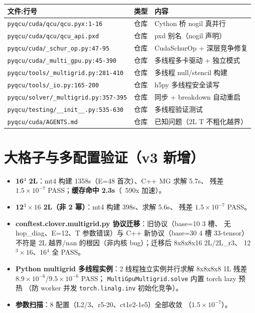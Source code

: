 \documentclass[UTF8]{ctexart}
\begin{document}
\begin{center}
\begin{tabular}{lll}
\toprule
文件:行号 & 类型 & 内容 \\
\midrule
\texttt{pyqcu/cuda/qcu/qcu.pyx:1-16} & 仓库 & Cython 桥 nogil 真并行 \\
\texttt{pyqcu/cuda/qcu/qcu\_api.pxd} & 仓库 & pxd 别名（nogil 声明）\\
\texttt{pyqcu/cuda/\_schur\_op.py:47-95} & 仓库 & CudaSchurOp + 深层竞争修复 \\
\texttt{pyqcu/cuda/\_multi\_gpu.py:45-390} & 仓库 & 多线程多卡驱动 + 独立模式 \\
\texttt{pyqcu/tools/\_multigrid.py:281-410} & 仓库 & 多线程 null/stencil 构建 \\
\texttt{pyqcu/tools/\_io.py:165-200} & 仓库 & h5py 多线程安全读写 \\
\texttt{pyqcu/solver/\_multigrid.py:357-395} & 仓库 & 同步 + breakdown 自动重启 \\
\texttt{pyqcu/testing/\_\_init\_\_.py:535-630} & 仓库 & 多线程验证测试 \\
\texttt{pyqcu/cuda/AGENTS.md} & 仓库 & 已知问题（2L T 不粗化越界）\\
\bottomrule
\end{tabular}
\end{center}

\section{大格子与多配置验证（v3 新增）}

\begin{itemize}
  \item \textbf{16$^4$ 2L}：mt4 构建 1358s（E=48 首次）、C++ MG 求解 5.7s、
        残差 $1.5\times10^{-7}$ PASS；\textbf{缓存命中 2.3s}（~590x 加速）。
  \item \textbf{12$^3\times16$ 2L（非 2 幂）}：mt4 构建 398s、求解 5.6s、
        残差 $1.5\times10^{-7}$ PASS。
  \item \textbf{conftest.clover.multigrid.py 协议迁移}：旧协议（base=10 3 槽、
        无 hop\_diag、E=12、T 参数错误）与 C++ 新协议（base=30 4 槽 33-tensor）
        不符是 2L 越界/nan 的根因（非内核 bug）；迁移后 8x8x8x16 2L/2L\_r3、
        12$^3\times16$、16$^4$ 全 PASS。
  \item \textbf{Python multigrid 多线程实例}：2 线程独立实例并行求解
        8x8x8x8 1L 残差 $8.9\times10^{-6}$/$9.5\times10^{-6}$ PASS；
        \texttt{MultiGpuMultigrid.solve} 内置 torch lazy 预热
        （防 worker 并发 \texttt{torch.linalg.inv} 初始化竞争）。
  \item \textbf{参数扫描}：8 配置（L2/3、r5-20、ct1e2-1e5）全部收敛
        （$1.5\times10^{-7}$）。
\end{itemize}
\end{document}
